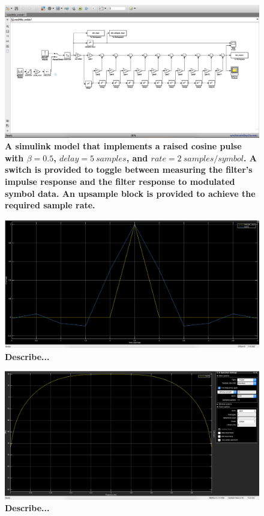 \documentclass[letterpaper,12pt]{article}
\begin{document}
\begin{figure}[hbtp]
\includegraphics[width=1.0\columnwidth]{prelab1-simulation-diagram}
\caption{
\label{fig:prelab1-simulation-diagram}
{\bf A simulink model that implements a raised cosine pulse with $\beta=0.5$,
$delay = 5\ samples$, and $rate = 2\ samples/symbol$. A switch is provided to
toggle between measuring the filter's impulse response and the filter response
to modulated symbol data. An upsample block is provided to achieve the required
sample rate.
}
}
\end{figure}

\begin{figure}[hbtp]
\includegraphics[width=1.0\columnwidth]{prelab1-filter-impulse-response}
\caption{
\label{fig:prelab1-filter-impulse-response}
{\bf Describe...
}
}
\end{figure}

\begin{figure}[hbtp]
\includegraphics[width=1.0\columnwidth]{prelab1-filter-impulse-spectrum}
\caption{
\label{fig:prelab1-filter-impulse-spectrum}
{\bf Describe...
}
}
\end{figure}
\end{document}
